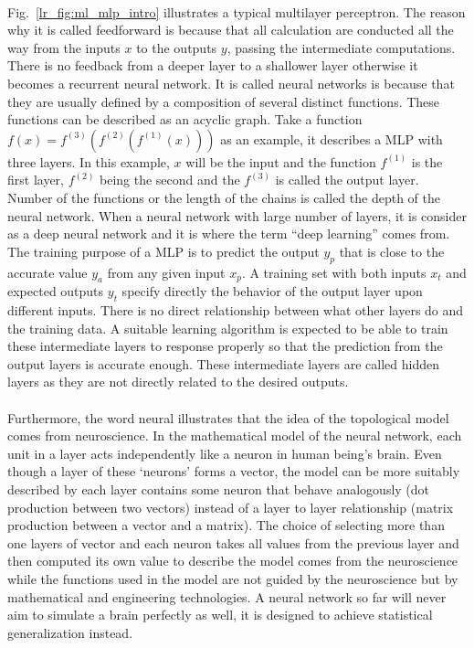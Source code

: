 \paragraph{}
Fig.~\ref{lr_fig:ml_mlp_intro} illustrates a typical multilayer perceptron.
The reason why it is called feedforward is because that all calculation are conducted all the way from the inputs $x$ to the outputs $y$, passing the intermediate computations.
There is no feedback from a deeper layer to a shallower layer otherwise it becomes a recurrent neural network.
It is called neural networks is because that they are usually defined by a composition of several distinct functions.
These functions can be described as an acyclic graph.
Take a function $f(x) = f^{(3)}(f^{(2)}(f^{(1)}(x)))$ as an example, it describes a MLP with three layers.
In this example, $x$ will be the input and the function $f^{(1)}$ is the first layer, $f^{(2)}$ being the second and the $f^{(3)}$ is called the output layer.
Number of the functions or the length of the chains is called the depth of the neural network.
When a neural network with large number of layers, it is consider as a deep neural network and it is where the term ``deep learning'' comes from.
The training purpose of a MLP is to predict the output $y_p$ that is close to the accurate value $y_a$ from any given input $x_p$.
A training set with both inputs $x_t$ and expected outputs $y_t$ specify directly the behavior of the output layer upon different inputs.
There is no direct relationship between what other layers do and the training data.
A suitable learning algorithm is expected to be able to train these intermediate layers to response properly so that the prediction from the output layers is accurate enough.
These intermediate layers are called hidden layers as they are not directly related to the desired outputs.
\paragraph{}
Furthermore, the word neural illustrates that the idea of the topological model comes from neuroscience.
In the mathematical model of the neural network, each unit in a layer acts independently like a neuron in human being's brain.
Even though a layer of these `neurons' forms a vector, the model can be more suitably described by each layer contains some neuron that behave analogously (dot production between two vectors) instead of a layer to layer relationship (matrix production between a vector and a matrix).
The choice of selecting more than one layers of vector and each neuron takes all values from the previous layer and then computed its own value to describe the model comes from the neuroscience while the functions used in the model are not guided by the neuroscience but by mathematical and engineering technologies.
A neural network so far will never aim to simulate a brain perfectly as well, it is designed to achieve statistical generalization instead.

